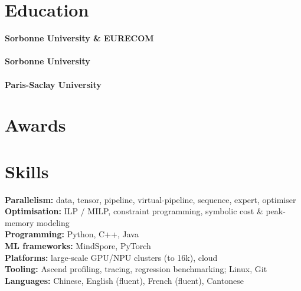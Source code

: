 \documentclass[a4paper,9pt]{article}
\begin{document}
\begin{minipage}[t]{0.33\textwidth}
\section*{Education}
{\fontsize{7.8pt}{8.4pt}\selectfont
\textbf{Sorbonne University \& EURECOM} \hfill {}\\
\\[2pt]
\textbf{Sorbonne University} \hfill {}\\
\\[2pt]
\textbf{Paris-Saclay University} \hfill {}\\
}

\section*{Awards}
\CompactListStart
\CompactListEnd

\section*{Skills}
{\fontsize{7.8pt}{8.6pt}\selectfont
\textbf{Parallelism:} data, tensor, pipeline, virtual-pipeline, sequence, expert, optimiser\\
\textbf{Optimisation:} ILP / MILP, constraint programming, symbolic cost \& peak-memory modeling\\
\textbf{Programming:} Python, C++, Java\\
\textbf{ML frameworks:} MindSpore, PyTorch\\
\textbf{Platforms:} large-scale GPU/NPU clusters (to 16k), cloud\\
\textbf{Tooling:} Ascend profiling, tracing, regression benchmarking; Linux, Git\\
\textbf{Languages:} Chinese, English (fluent), French (fluent), Cantonese}
\end{minipage}
\end{document}
